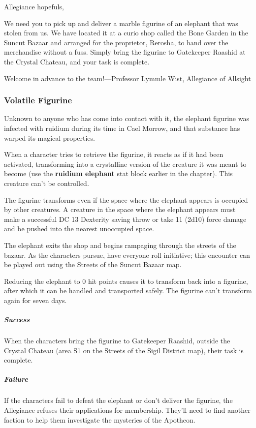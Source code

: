 \documentclass[10pt,a4paper,twoside,fancy,bg=print,twocolumn,openany,nodeprecatedcode]{dndbook}
\begin{document}
\begin{DndReadAloud}{}
Allegiance hopefuls,

We need you to pick up and deliver a marble figurine of an elephant that was stolen from us. We have located it at a curio shop called the Bone Garden in the Suncut Bazaar and arranged for the proprietor, Rerosha, to hand over the merchandise without a fuss. Simply bring the figurine to Gatekeeper Raashid at the Crystal Chateau, and your task is complete.

Welcome in advance to the team!—Professor Lymmle Wist, Allegiance of Allsight

\end{DndReadAloud}

\subsubsection{Volatile Figurine}
Unknown to anyone who has come into contact with it, the elephant figurine was infected with ruidium during its time in Cael Morrow, and that substance has warped its magical properties.

When a character tries to retrieve the figurine, it reacts as if it had been activated, transforming into a crystalline version of the creature it was meant to become (use the \textbf{ruidium elephant} stat block earlier in the chapter). This creature can't be controlled.

The figurine transforms even if the space where the elephant appears is occupied by other creatures. A creature in the space where the elephant appears must make a successful DC 13 Dexterity saving throw or take 11 (2d10) force damage and be pushed into the nearest unoccupied space.

The elephant exits the shop and begins rampaging through the streets of the bazaar. As the characters pursue, have everyone roll initiative; this encounter can be played out using the Streets of the Suncut Bazaar map.

Reducing the elephant to 0 hit points causes it to transform back into a figurine, after which it can be handled and transported safely. The figurine can't transform again for seven days.

\subparagraph{Success}
When the characters bring the figurine to Gatekeeper Raashid, outside the Crystal Chateau (area S1 on the Streets of the Sigil District map), their task is complete.

\subparagraph{Failure}
If the characters fail to defeat the elephant or don't deliver the figurine, the Allegiance refuses their applications for membership. They'll need to find another faction to help them investigate the mysteries of the Apotheon.
\end{document}
